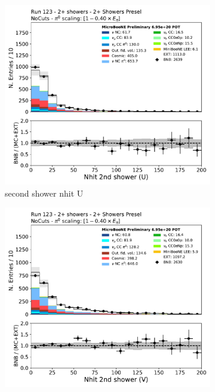 \begin{figure}[H]
    \centering
    \begin{subfigure}{0.3\textwidth}
    \includegraphics[width=1.0\textwidth]{Sidebands/Figures/TwoShr_1e0pSel/Presel/secondshower_U_nhit.pdf}
    \caption{second shower nhit U}
    \end{subfigure}
    \begin{subfigure}{0.3\textwidth}
    \includegraphics[width=1.0\textwidth]{Sidebands/Figures/TwoShr_1e0pSel/Presel/secondshower_V_nhit.pdf}

\end{subfigure}
\end{figure}
